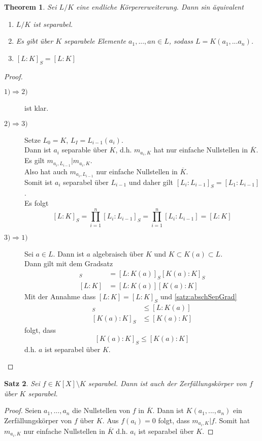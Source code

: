 \documentclass[10pt,a4paper]{article}
\newcommand{\ol}[1]{\overline{#1}}
\theoremstyle{plain}
\newtheorem{theorem}{Theorem}[section]
\newtheorem{satz}[theorem]{Satz}
\theoremstyle{definition}
\theoremstyle{remark}
\begin{document}
	\begin{theorem}
		Sei $L/K$ eine endliche Körpererweiterung. Dann sin äquivalent
		\begin{enumerate}
			\item $L/K$ ist separabel.
			\item Es gibt über $K$ separabele Elemente $a_1,...,an\in L$, sodass $L=K(a_1,...a_n)$.
			\item $[L:K]_S=[L:K]$
		\end{enumerate}
	\end{theorem}
	\begin{proof}
		\begin{description}
			\item[$1)\Rightarrow 2)$] ist klar.
			\item[$2)\Rightarrow 3)$] Setze $L_0=K$, $L_I=L_{i-1}(a_i)$.\\
			Dann ist $a_i$ separable über $K$, d.h. $m_{a_i,K}$ hat nur einfache Nullstellen in $\ol K$. Es gilt $m_{a_i,L_{i-1}}|m_{a_i,K}$.\\
			Also hat auch $m_{a_i,L_{i-1}}$ nur einfache Nullstellen in $\ol K$.\\
			Somit ist $a_i$ separabel über $L_{i-1}$ und daher gilt $[L_i:L_{i-1}]_S=[L_1:L_{i-1}]$.\\
			Es folgt
			\[[L:K]_S=\prod_{i=1}^{n}[L_i:L_{i-1}]_S=\prod_{i=1}^{n}[L_i:L_{i-1}]=[L:K]\]
			\item[$3)\Rightarrow 1)$] Sei $a\in L$. Dann ist $a$ algebraisch über $K$ und $K\subset K(a)\subset L$.\\
			Dann gilt mit dem Gradsatz
			\begin{align*}
			[L:K]_S&=[L:K(a)]_S[K(a):K]_S\\
			[L:K]&=[L:K(a)][K(a):K]
			\end{align*}
			Mit der Annahme dass $[L:K]=[L:K]_S$ und \ref{satz:abschSepGrad}
			\begin{align*}
			[L:K(a)]_S&\leq [L:K(a)]\\
			[K(a):K]_S&\leq [K(a):K]
			\end{align*}
			folgt, dass
			\[[K(a):K]_S\leq [K(a):K]\]
			d.h. $a$ ist separabel über $K$.
		\end{description}
	\end{proof}

	\begin{satz}
		Sei $f\in K[X]\setminus K$ separabel. Dann ist auch der Zerfällungskörper von $f$ über $K$ separabel.
	\end{satz}
	\begin{proof}
		Seien $a_1,...,a_n$ die Nullstellen von $f$ in $\ol K$. Dann ist $K(a_1,...,a_n)$ ein Zerfällungskörper von $f$ über $K$. Aus $f(a_i)=0$ folgt, dass $m_{a_i,K}|f$. Somit hat $m_{a_i,K}$ nur einfache Nullstellen in $\ol K$ d.h. $a_i$ ist separabel über $K$.
	\end{proof}
\end{document}
